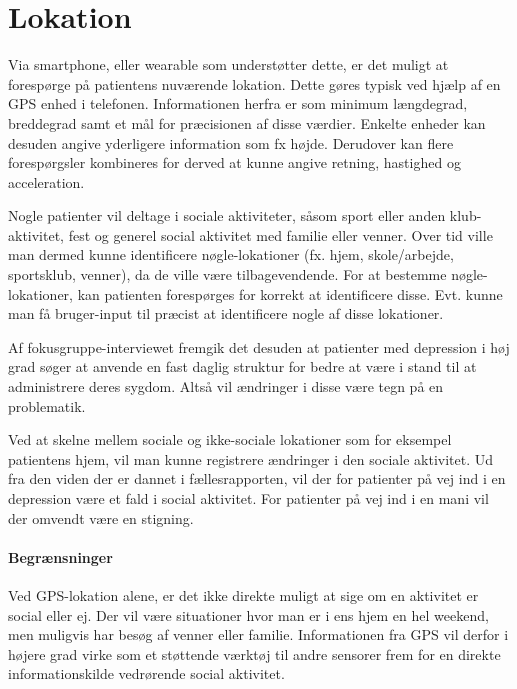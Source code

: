 \section{Lokation}
Via smartphone, eller wearable som understøtter dette, er det muligt at forespørge på patientens nuværende lokation.
Dette gøres typisk ved hjælp af en GPS enhed i telefonen.
Informationen herfra er som minimum længdegrad, breddegrad samt et mål for præcisionen af disse værdier.
Enkelte enheder kan desuden angive yderligere information som fx højde.
Derudover kan flere forespørgsler kombineres for derved at kunne angive retning, hastighed og acceleration.

Nogle patienter vil deltage i sociale aktiviteter, såsom sport eller anden klub-aktivitet, fest og generel social aktivitet med familie eller venner.
Over tid ville man dermed kunne identificere nøgle-lokationer (fx. hjem, skole/arbejde, sportsklub, venner), da de ville være tilbagevendende.
For at bestemme nøgle-lokationer, kan patienten forespørges for korrekt at identificere disse.
Evt. kunne man få bruger-input til præcist at identificere nogle af disse lokationer.

Af fokusgruppe-interviewet fremgik det desuden at patienter med depression i høj grad søger at anvende en fast daglig struktur for bedre at være i stand til at administrere deres sygdom.
Altså vil ændringer i disse være tegn på en problematik.

Ved at skelne mellem sociale og ikke-sociale lokationer som for eksempel patientens hjem, vil man kunne registrere ændringer i den sociale aktivitet.
Ud fra den viden der er dannet i fællesrapporten, vil der for patienter på vej ind i en depression være et fald i social aktivitet.
For patienter på vej ind i en mani vil der omvendt være en stigning.

\paragraph{Begrænsninger}
Ved GPS-lokation alene, er det ikke direkte muligt at sige om en aktivitet er social eller ej.
Der vil være situationer hvor man er i ens hjem en hel weekend, men muligvis har besøg af venner eller familie.
Informationen fra GPS vil derfor i højere grad virke som et støttende værktøj til andre sensorer frem for en direkte informationskilde vedrørende social aktivitet.